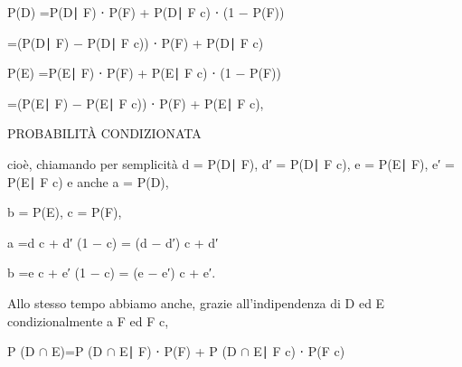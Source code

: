 \documentclass[a4paper,portrait,12pt]{article}
\begin{document}
\begin{flushleft}
P(D) =P(D∣ F) ⋅ P(F) + P(D∣ F c) ⋅ (1 $-$ P(F))
\end{flushleft}


\begin{flushleft}
=(P(D∣ F) $-$ P(D∣ F c)) ⋅ P(F) + P(D∣ F c)
\end{flushleft}


\begin{flushleft}
P(E) =P(E∣ F) ⋅ P(F) + P(E∣ F c) ⋅ (1 $-$ P(F))
\end{flushleft}


\begin{flushleft}
=(P(E∣ F) $-$ P(E∣ F c)) ⋅ P(F) + P(E∣ F c),
\end{flushleft}










\begin{flushleft}
PROBABILIT\`{A} CONDIZIONATA
\end{flushleft}





\begin{flushleft}
cio\`{e}, chiamando per semplicit\`{a} d = P(D∣ F), d′ = P(D∣ F c), e = P(E∣ F), e′ = P(E∣ F c) e anche a = P(D),
\end{flushleft}


\begin{flushleft}
b = P(E), c = P(F),
\end{flushleft}


\begin{flushleft}
a =d c + d′ (1 $-$ c) = (d $-$ d′) c + d′
\end{flushleft}


\begin{flushleft}
b =e c + e′ (1 $-$ c) = (e $-$ e′) c + e′.
\end{flushleft}


\begin{flushleft}
Allo stesso tempo abbiamo anche, grazie all'indipendenza di D ed E condizionalmente a F ed F c,
\end{flushleft}


\begin{flushleft}
P (D $\cap$ E)=P (D $\cap$ E∣ F) ⋅ P(F) + P (D $\cap$ E∣ F c) ⋅ P(F c)
\end{flushleft}
\end{document}

